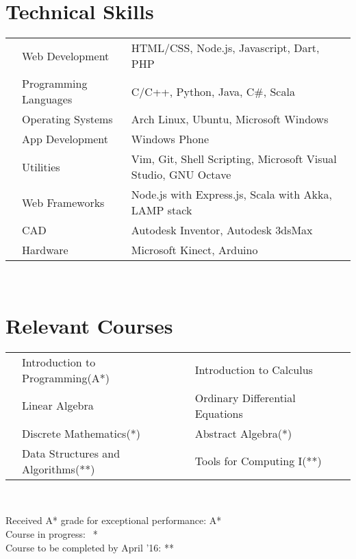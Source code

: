 \documentclass[11pt,a4paper]{article}
\begin{document}
\section*{Technical Skills}
\begin{tabular}{L{0.05cm} L{5cm} l}
&Web Development 	        &HTML/CSS, Node.js, Javascript, Dart, PHP \\
&Programming Languages      &C/C++, Python, Java, C\#, Scala\\
&Operating Systems	        &Arch Linux, Ubuntu, Microsoft Windows\\
&App Development		    &Windows Phone\\
&Utilities                  &Vim, Git, Shell Scripting, Microsoft Visual Studio, GNU Octave\\
&Web Frameworks             &Node.js with Express.js, Scala with Akka, LAMP stack\\
&CAD	                	&Autodesk Inventor, Autodesk 3dsMax\\
&Hardware                   &Microsoft Kinect, Arduino\\

\end{tabular}\\


\section*{Relevant Courses}
\begin{tabular}{L{0.05cm} L{7cm} L{5.5cm} L{5.5cm}}
& Introduction to Programming(A*)    & Introduction to Calculus        \\
& Linear Algebra                     & Ordinary Differential  Equations\\
& Discrete Mathematics(*)            & Abstract Algebra(*)\\
& Data Structures and Algorithms(**) & Tools for Computing I(**)\\
\end{tabular}\\

\begin{flushright}
  \footnotesize{Received A* grade for exceptional performance: A*}\\
  \footnotesize{Course in progress:$\ \ $ *}\\
  \footnotesize{Course to be completed by April '16: **}\\
\end{flushright}

\
\end{document}

